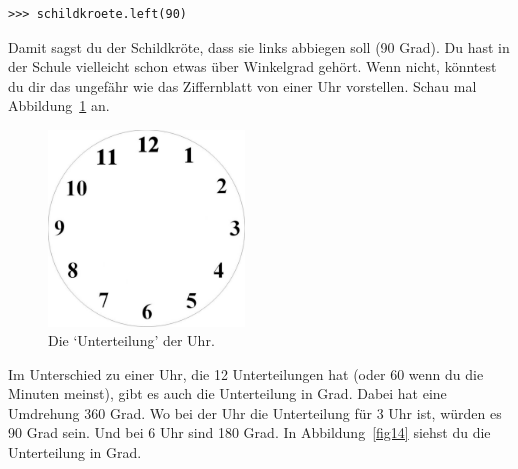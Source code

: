 \begin{Verbatim}[frame=single]
>>> schildkroete.left(90)
\end{Verbatim}

Damit sagst du der Schildkröte, dass sie links abbiegen soll (90 Grad). Du hast in der Schule vielleicht schon etwas über Winkelgrad gehört. Wenn nicht, könntest du dir das ungefähr wie das Ziffernblatt von einer Uhr vorstellen. Schau mal Abbildung~\ref{fig13} an.

\begin{figure}
\begin{center}
\includegraphics[width=52mm]{images/figure13}
\end{center}
\caption{Die `Unterteilung' der Uhr.}\label{fig13}
\end{figure}

Im Unterschied zu einer Uhr, die 12 Unterteilungen hat (oder 60 wenn du die Minuten meinst), gibt es auch die Unterteilung in Grad. Dabei hat eine Umdrehung 360 Grad. Wo bei der Uhr die Unterteilung für 3 Uhr ist, würden es 90 Grad sein. Und bei 6 Uhr sind 180 Grad. In Abbildung~\ref{fig14} siehst du die Unterteilung in Grad.

